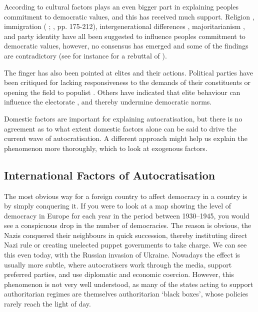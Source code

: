 According to \citet{margalit_economic_2019} cultural factors plays an even bigger part in explaining peoples commitment to democratic values, and this has received much support. Religion \citep[pp.72-85]{huntington_third_1991}, immigration (\citeauthor{dinas_waking_2019} \citeyear{dinas_waking_2019}; \citeauthor{norris_cultural_2019} \citeyear{norris_cultural_2019}, pp. 175-212), intergenerational differences \citep{foa_youth_2020, foa_danger_2016, norris_cultural_2019, wuttke_have_2022}, majoritarianism \citep{grossman_majoritarian_2022, wunsch_demand_2023}, and party identity \citep{abramowitz_united_2019, bisgaard_how_2019, graham_democracy_2020, iyengar_strengthening_2018, krishnarajan_rationalizing_2023, peterson_partisan_2021, singer_fiddling_2023} have all been suggested to influence peoples commitment to democratic values, however, no consensus has emerged and some of the findings are contradictory (see for instance \citeauthor{schafer_cultural_2022} \citeyear{schafer_cultural_2022} for a rebuttal of \citeauthor{norris_cultural_2019} \citeyear{norris_cultural_2019}). 

The finger has also been pointed at elites and their actions. Political parties have been critiqued for lacking responsiveness to the demands of their constituents or opening the field to populist \citep{berman_causes_2021, grzymala-busse_failure_2019}. Others have indicated that elite behaviour can influence the electorate \citep{broockman_causal_2017, clayton_elite_2021}, and thereby undermine democratic norms.

Domestic factors are important for explaining autocratisation, but there is no agreement as to what extent domestic factors alone can be said to drive the current wave of autocratisation. A different approach might help us explain the phenomenon more thoroughly, which to look at exogenous factors.

\subsection{International Factors of Autocratisation}
The most obvious way for a foreign country to affect democracy in a country is by simply conquering it. If you were to look at a map showing the level of democracy in Europe for each year in the period between 1930--1945, you would see a conspicuous drop in the number of democracies. The reason is obvious, the Nazis conquered their neighbours in quick succession, thereby instituting direct Nazi rule or creating unelected puppet governments to take charge. We can see this even today, with the Russian invasion of Ukraine. Nowadays the effect is usually more subtle, where autocratisers work through the media, support preferred parties, and use diplomatic and economic coercion. However, this phenomenon is not very well understood, as many of the states acting to support authoritarian regimes are themselves authoritarian `black boxes', whose policies rarely reach the light of day.  

